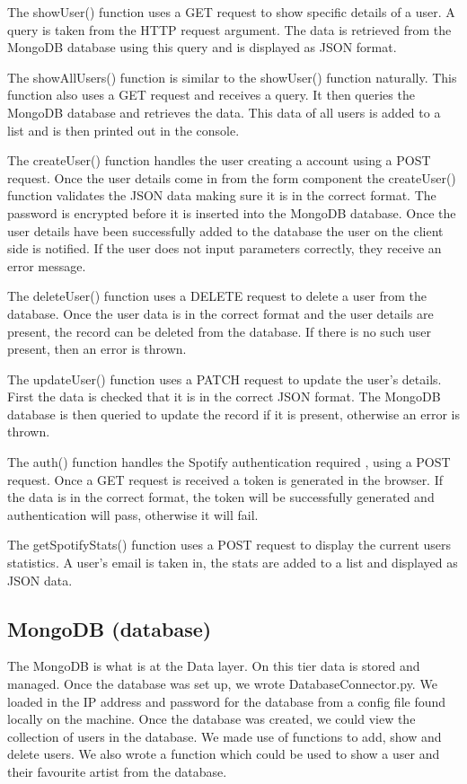 The showUser() function uses a GET request to show specific details of a user. A query is taken from the HTTP request argument. The data is retrieved from the MongoDB database using this query and is displayed as JSON format.

The showAllUsers() function is similar to the showUser() function  naturally. This function also uses a GET request and receives a query. It then queries the MongoDB database and retrieves the data. This data of all users is added to a list and is then printed out in the console.

The createUser() function handles the user creating a account using a POST request. Once the user details come in from the form component the createUser() function validates the JSON data making sure it is in the correct format. The password is encrypted before it is inserted into the MongoDB database. Once the user details have been successfully added to the database the user on the client side is notified. If the user does not input parameters correctly, they receive an error message.

The deleteUser() function uses a DELETE request to delete a user from the database. Once the user data is in the correct format and the user details are present, the record can be deleted from the database. If there is no such user present, then an error is thrown.

The updateUser() function uses a PATCH request to update the user’s details. First the data is checked that it is in the correct JSON format. The MongoDB database is then queried to update the record if it is present, otherwise an error is thrown.

The auth() function handles the Spotify authentication required , using a POST request. Once a GET request is received a token is generated in the browser. If the data is in the correct format, the token will be successfully generated and authentication will pass, otherwise it will fail.

The getSpotifyStats() function uses a POST request to display the current users statistics. A user’s email is taken in, the stats are added to a list and displayed as JSON data.


\subsection{MongoDB (database)}
The MongoDB is what is at the Data layer. On this tier data is stored and managed. Once the database was set up, we wrote DatabaseConnector.py. We loaded in the IP address and password for the database from a config file found locally on the machine. Once the database was created, we could view the collection of users in the database. We made use of functions to add, show and delete users. We also wrote a function which could be used to show a user and their favourite artist from the database.

